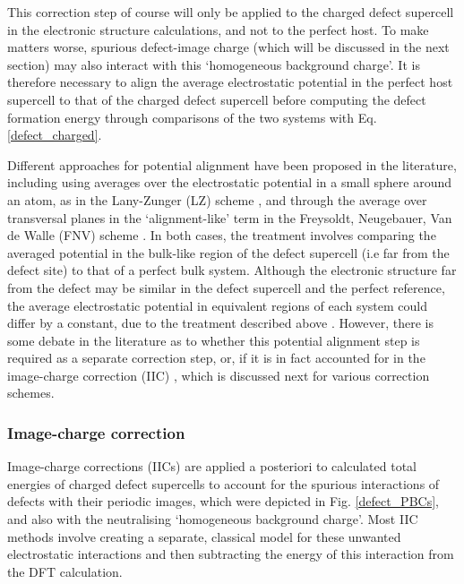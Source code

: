 \documentclass[11pt, twoside]{report}
\begin{document}
This correction step of course will only be applied to the charged defect supercell in the electronic structure calculations, and not to the perfect host. To make matters worse, spurious defect-image charge (which will be discussed in the next section) may also interact with this `homogeneous background charge'.
It is therefore necessary to align the average electrostatic potential in the perfect host supercell to that of the charged defect supercell before computing the defect formation energy through comparisons of the two systems with Eq. \ref{defect_charged}.
 
Different approaches for potential alignment have been proposed in the literature, including using averages over the electrostatic potential in a small sphere around an atom, as in the Lany-Zunger (LZ) scheme \cite{Lany_defects}, and through the average over transversal planes in the `alignment-like' term in the Freysoldt, Neugebauer, Van de Walle (FNV) scheme \cite{FNV, kumagai_oba}. In both cases, the treatment involves comparing the averaged potential in the bulk-like region of the defect supercell (i.e far from the defect site) to that of a perfect bulk system. Although the electronic structure far from the defect may be similar in the defect supercell and the perfect reference, the average electrostatic potential in equivalent regions of each system could differ by a constant, due to the treatment described above \cite{komsa}. 
However, there is some debate in the literature as to whether this potential alignment step is required as a separate correction step, or, if it is in fact accounted for in the image-charge correction (IIC) \cite{kumagai_oba}, which is discussed next for various correction schemes. 


\subsubsection{Image-charge correction}
Image-charge corrections (IICs) are applied a posteriori to calculated total energies of charged defect supercells to account for the spurious interactions of defects with their periodic images, which were depicted in Fig. \ref{defect_PBCs}, and also with the neutralising `homogeneous background charge'. Most IIC methods involve creating a separate, classical model for these unwanted electrostatic interactions and then subtracting the energy of this interaction from the DFT calculation.
\end{document}
